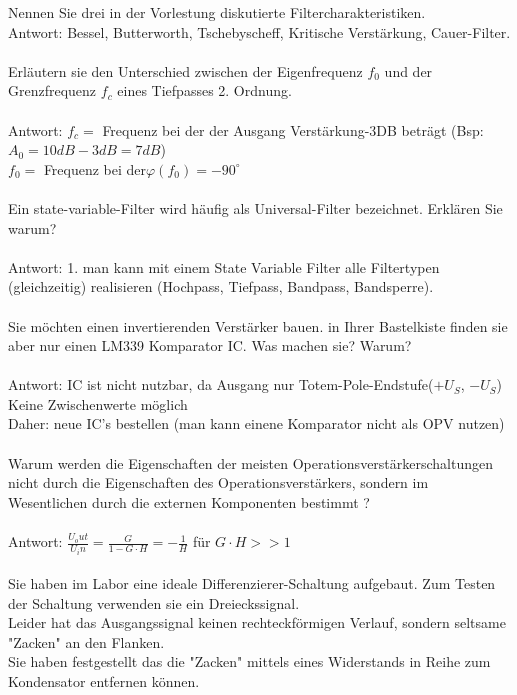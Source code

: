 \documentclass[A4]{scrartcl}
\begin{document}
  Nennen Sie drei in der Vorlestung diskutierte Filtercharakteristiken.
  \\
  Antwort: Bessel, Butterworth, Tschebyscheff, Kritische Verstärkung, Cauer-Filter.\\\\
  Erläutern sie den Unterschied zwischen der Eigenfrequenz $f_0$ und der Grenzfrequenz $f_c$ eines Tiefpasses 2. Ordnung.\\
  \\
  Antwort:
  $f_c = $ Frequenz bei der der Ausgang Verstärkung-3DB beträgt (Bsp: $A_0 = 10dB - 3dB = 7dB $)\\
  $f_0 = $ Frequenz bei der$\varphi(f_0) = -90^\circ$\\\\
  Ein state-variable-Filter wird häufig als Universal-Filter bezeichnet. Erklären Sie warum?\\
  \\
  Antwort: 1. man kann mit einem State Variable Filter alle Filtertypen (gleichzeitig) realisieren (Hochpass, Tiefpass, Bandpass, Bandsperre).\\\\
  Sie möchten einen invertierenden Verstärker bauen. in Ihrer Bastelkiste finden sie aber nur einen LM339 Komparator IC. Was machen sie? Warum?\\
  \\
  Antwort: IC ist nicht nutzbar, da Ausgang nur Totem-Pole-Endstufe($ +U_S$, $-U_S$)\\
  Keine Zwischenwerte möglich\\
  Daher: neue IC's bestellen (man kann einene Komparator nicht als OPV nutzen)\\\\
  Warum werden die Eigenschaften der meisten Operationsverstärkerschaltungen nicht durch die Eigenschaften des Operationsverstärkers, sondern im Wesentlichen durch die externen Komponenten bestimmt ?\\
  \\
  Antwort: $\frac{U_out}{U_in} = \frac{G}{1-G\cdot H} = -\frac{1}{H}$ für $G\cdot H >> 1$\\\\
  Sie haben im Labor eine ideale Differenzierer-Schaltung aufgebaut. Zum Testen der Schaltung verwenden sie ein Dreieckssignal.\\
  Leider hat das Ausgangssignal keinen rechteckförmigen Verlauf, sondern seltsame "Zacken" an den Flanken.\\
  Sie haben festgestellt das die "Zacken" mittels eines Widerstands in Reihe zum Kondensator entfernen können.\\
\end{document}
